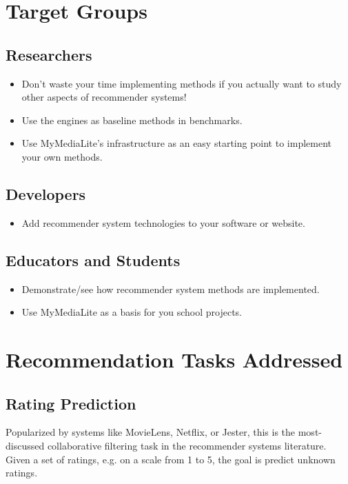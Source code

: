 \documentclass[a4paper, foldmark, 12pt]{leaflet}
\begin{document}
\newpage

\section{Target Groups}

\subsection{Researchers}
\begin{itemize}
	\item Don't waste your time implementing methods
	      if you actually want to study
	      other aspects of recommender systems!
	\item Use the engines as baseline methods in benchmarks.
	\item Use MyMediaLite's infrastructure as an easy
	      starting point to implement your own methods.
\end{itemize}

\subsection{Developers}
\begin{itemize}
	\item Add recommender system technologies to your software or website.
\end{itemize}

\subsection{Educators and Students}
\begin{itemize}
	\item Demonstrate/see how recommender system methods are implemented.
	\item Use MyMediaLite as a basis for you school projects.
\end{itemize}

\newpage

\section{Recommendation Tasks Addressed}

\subsection{Rating Prediction}

Popularized by systems like MovieLens, Netflix, or Jester,
this is the most-discussed collaborative filtering task in the
recommender systems literature.
Given a set of ratings, e.g. on a scale from 1 to 5,
the goal is predict unknown ratings.
\end{document}
